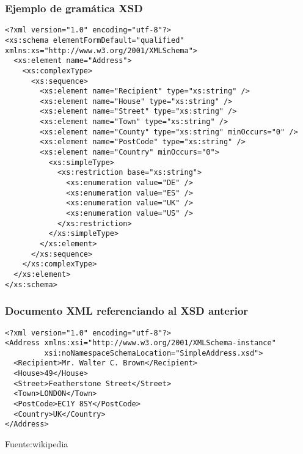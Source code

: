 \documentclass[ucs]{beamer}
\begin{document}
\begin{frame}[fragile]
\frametitle{Ejemplo de gramática XSD}

  \begin{tiny}
  \begin{verbatim}
<?xml version="1.0" encoding="utf-8"?>
<xs:schema elementFormDefault="qualified" xmlns:xs="http://www.w3.org/2001/XMLSchema">
  <xs:element name="Address">
    <xs:complexType>
      <xs:sequence>
        <xs:element name="Recipient" type="xs:string" />
        <xs:element name="House" type="xs:string" />
        <xs:element name="Street" type="xs:string" />
        <xs:element name="Town" type="xs:string" />
        <xs:element name="County" type="xs:string" minOccurs="0" />
        <xs:element name="PostCode" type="xs:string" />
        <xs:element name="Country" minOccurs="0">
          <xs:simpleType>
            <xs:restriction base="xs:string">
              <xs:enumeration value="DE" />
              <xs:enumeration value="ES" />
              <xs:enumeration value="UK" />
              <xs:enumeration value="US" />
            </xs:restriction>
          </xs:simpleType>
        </xs:element>
      </xs:sequence>
    </xs:complexType>
  </xs:element>
</xs:schema>
  \end{verbatim}
  \end{tiny}

  \begin{scriptsize}
  \begin{flushright}
  \end{flushright}
  \end{scriptsize}

\end{frame}


\begin{frame}[fragile]
\frametitle{Documento XML referenciando al XSD anterior}

  \begin{footnotesize}
  \begin{verbatim}
<?xml version="1.0" encoding="utf-8"?>
<Address xmlns:xsi="http://www.w3.org/2001/XMLSchema-instance"
         xsi:noNamespaceSchemaLocation="SimpleAddress.xsd">
  <Recipient>Mr. Walter C. Brown</Recipient>
  <House>49</House>
  <Street>Featherstone Street</Street>
  <Town>LONDON</Town>
  <PostCode>EC1Y 8SY</PostCode>
  <Country>UK</Country>
</Address>
  \end{verbatim}
  \end{footnotesize}

  \begin{scriptsize}
  \begin{flushright}
Fuente:wikipedia
  \end{flushright}
  \end{scriptsize}

\end{frame}
\end{document}
